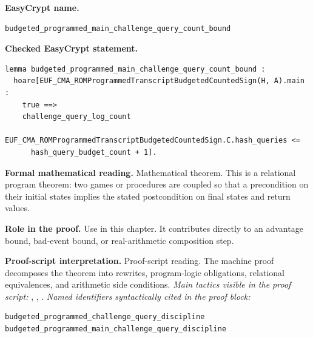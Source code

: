 \begin{formaltheorem}
\noindent\textbf{EasyCrypt name.}
\begin{lstlisting}[language=EasyCrypt,basicstyle=\ttfamily\scriptsize]
budgeted_programmed_main_challenge_query_count_bound
\end{lstlisting}
\noindent\textbf{Checked EasyCrypt statement.}
\begin{lstlisting}[language=EasyCrypt,basicstyle=\ttfamily\scriptsize]
lemma budgeted_programmed_main_challenge_query_count_bound :
  hoare[EUF_CMA_ROMProgrammedTranscriptBudgetedCountedSign(H, A).main :
    true ==>
    challenge_query_log_count
      EUF_CMA_ROMProgrammedTranscriptBudgetedCountedSign.C.hash_queries <=
      hash_query_budget_count + 1].
\end{lstlisting}
\noindent\textbf{Formal mathematical reading.}
Mathematical theorem. This is a relational program theorem: two games or procedures are coupled so that a precondition on their initial states implies the stated postcondition on final states and return values.

\noindent\textbf{Role in the proof.}
Use in this chapter. It contributes directly to an advantage bound, bad-event bound, or real-arithmetic composition step.

\noindent\textbf{Proof-script interpretation.}
Proof-script reading. The machine proof decomposes the theorem into rewrites, program-logic obligations, relational equivalences, and arithmetic side conditions.
\emph{Main tactics visible in the proof script:} , , .
\emph{Named identifiers syntactically cited in the proof block:}
\begin{lstlisting}[language=EasyCrypt,basicstyle=\ttfamily\scriptsize]
budgeted_programmed_challenge_query_discipline
budgeted_programmed_main_challenge_query_discipline
\end{lstlisting}

\end{formaltheorem}

